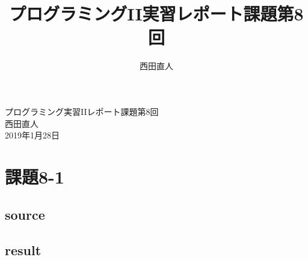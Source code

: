 \documentclass[10pt,a4paper]{jsarticle}
\title{プログラミングII実習レポート課題第8回}
\author{西田直人}
\begin{document}
\begin{center}
{\LARGE プログラミング実習IIレポート課題第8回} \\
\large
西田直人 \\ 2019年1月28日
\end{center}
\normalsize
\section{課題8-1}

\subsection{source}






\subsection{result}
\end{document}
